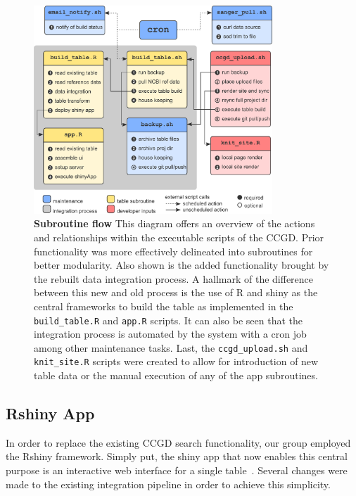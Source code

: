 \documentclass[10pt]{report}
\begin{document}
\begin{figure}[H]
    \center{}
    \includegraphics[width=0.8\textwidth]{fig/subroutine_flow.pdf}
    \caption[Subroutine flow]{\textbf{Subroutine flow} This diagram offers an overview of the actions and relationships within the executable scripts of the CCGD\@. Prior functionality was more effectively delineated into subroutines for better modularity. Also shown is the added functionality brought by the rebuilt data integration process. A hallmark of the difference between this new and old process is the use of R and shiny as the central frameworks to build the table as implemented in the \texttt{build\_table.R} and \texttt{app.R} scripts. It can also be seen that the integration process is automated by the system with a cron job among other maintenance tasks. Last, the \texttt{ccgd\_upload.sh} and \texttt{knit\_site.R} scripts were created to allow for introduction of new table data or the manual execution of any of the app subroutines.}\label{fig:subroutine}
\end{figure}

\subsection{Rshiny App}
In order to replace the existing CCGD search functionality, our group employed the Rshiny framework. Simply put, the shiny app that now enables this central purpose is an interactive web interface for a single table~\cite{changShinyWebApplication2021}. Several changes were made to the existing integration pipeline in order to achieve this simplicity.
\end{document}
